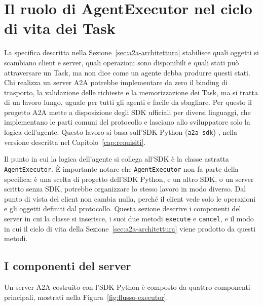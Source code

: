 \section{Il ruolo di AgentExecutor nel ciclo di vita dei Task}
\label{sec:agent-executor}
La specifica descritta nella Sezione~\ref{sec:a2a-architettura} stabilisce quali oggetti si scambiano client e server, quali operazioni sono disponibili e quali stati può attraversare un Task, ma non dice come un agente debba produrre questi stati. Chi realizza un server A2A potrebbe implementare da zero il binding di trasporto, la validazione delle richieste e la memorizzazione dei Task, ma si tratta di un lavoro lungo, uguale per tutti gli agenti e facile da sbagliare. Per questo il progetto A2A mette a disposizione degli SDK ufficiali per diversi linguaggi, che implementano le parti comuni del protocollo e lasciano allo sviluppatore solo la logica dell'agente. Questo lavoro si basa sull'SDK Python (\texttt{a2a-sdk}) \cite{a2apythonsdk}, nella versione descritta nel Capitolo~\ref{cap:requisiti}.

Il punto in cui la logica dell'agente si collega all'SDK è la classe astratta \texttt{AgentExecutor}. È importante notare che \texttt{AgentExecutor} non fa parte della specifica: è una scelta di progetto dell'SDK Python, e un altro SDK, o un server scritto senza SDK, potrebbe organizzare lo stesso lavoro in modo diverso. Dal punto di vista del client non cambia nulla, perché il client vede solo le operazioni e gli oggetti definiti dal protocollo. Questa sezione descrive i componenti del server in cui la classe si inserisce, i suoi due metodi \texttt{execute} e \texttt{cancel}, e il modo in cui il ciclo di vita della Sezione~\ref{sec:a2a-architettura} viene prodotto da questi metodi.

\subsection{I componenti del server}

Un server A2A costruito con l'SDK Python è composto da quattro componenti principali, mostrati nella Figura~\ref{fig:flusso-executor}.

